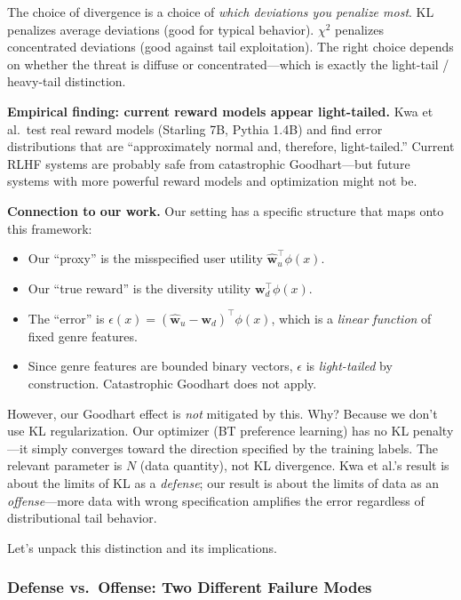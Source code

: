 \documentclass[11pt]{article}
\begin{document}
The choice of divergence is a choice of \emph{which deviations you
penalize most}. KL penalizes average deviations (good for typical
behavior). $\chi^2$ penalizes concentrated deviations (good against
tail exploitation). The right choice depends on whether the threat is
diffuse or concentrated---which is exactly the light-tail / heavy-tail
distinction.

\textbf{Empirical finding: current reward models appear light-tailed.}
Kwa et al.\ test real reward models (Starling 7B, Pythia 1.4B) and find
error distributions that are ``approximately normal and, therefore,
light-tailed.'' Current RLHF systems are probably safe from
catastrophic Goodhart---but future systems with more powerful reward
models and optimization might not be.

\textbf{Connection to our work.} Our setting has a specific structure
that maps onto this framework:
\begin{itemize}
  \item Our ``proxy'' is the misspecified user utility
    $\hat{\mathbf{w}}_u^\top \phi(x)$.
  \item Our ``true reward'' is the diversity utility
    $\mathbf{w}_d^\top \phi(x)$.
  \item The ``error'' is $\epsilon(x) = (\hat{\mathbf{w}}_u -
    \mathbf{w}_d)^\top \phi(x)$, which is a \emph{linear function}
    of fixed genre features.
  \item Since genre features are bounded binary vectors, $\epsilon$
    is \emph{light-tailed} by construction. Catastrophic Goodhart
    does not apply.
\end{itemize}

However, our Goodhart effect is \emph{not} mitigated by this. Why?
Because we don't use KL regularization. Our optimizer (BT preference
learning) has no KL penalty---it simply converges toward the direction
specified by the training labels. The relevant parameter is $N$ (data
quantity), not KL divergence. Kwa et al.'s result is about the limits
of KL as a \emph{defense}; our result is about the limits of data as an
\emph{offense}---more data with wrong specification amplifies the error
regardless of distributional tail behavior.

Let's unpack this distinction and its implications.

\subsubsection*{Defense vs.\ Offense: Two Different Failure Modes}
\end{document}

